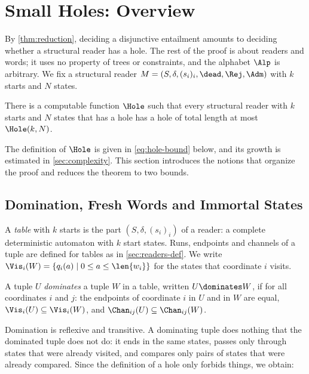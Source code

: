 \section{Small Holes: Overview}
\label{sec:overview}

By \cref{thm:reduction}, deciding a disjunctive entailment amounts to
deciding whether a structural reader has a hole. The rest of the proof is
about readers and words; it uses no property of trees or constraints, and
the alphabet $\Alp$ is arbitrary. We fix a structural reader
$M=(S,\delta,(s_i)_i,\dead,\Rej,\Adm)$ with $k$ starts and $N$ states.

\begin{theorem}\label{thm:small-hole}
There is a computable function $\Hole$ such that every structural reader with
$k$ starts and $N$ states that has a hole has a hole of total length at most
$\Hole(k,N)$.
\end{theorem}

The definition of $\Hole$ is given in \cref{eq:hole-bound} below, and its
growth is estimated in \cref{sec:complexity}. This section introduces the
notions that organize the proof and reduces the theorem to two bounds.

\subsection{Domination, Fresh Words and Immortal States}
\label{sec:overview-notions}

A \emph{table} with $k$ starts is the part $(S,\delta,(s_i)_i)$ of a reader:
a complete deterministic automaton with $k$ start states. Runs, endpoints and
channels of a tuple are defined for tables as in \cref{sec:readers-def}. We
write $\Vis_i(W)=\{q_i(a)\mid 0\le a\le\len{w_i}\}$ for the states that
coordinate $i$ visits.

\begin{definition}[Domination]\label{def:domination}
A tuple $U$ \emph{dominates} a tuple $W$ in a table, written $U\dominates W$,
if for all coordinates $i$ and $j$: the endpoints of coordinate $i$ in $U$
and in $W$ are equal, $\Vis_i(U)\subseteq\Vis_i(W)$, and
$\Chan_{ij}(U)\subseteq\Chan_{ij}(W)$.
\end{definition}

Domination is reflexive and transitive. A dominating tuple does nothing that
the dominated tuple does not do: it ends in the same states, passes only
through states that were already visited, and compares only pairs of states
that were already compared. Since the definition of a hole only forbids
things, we obtain:

